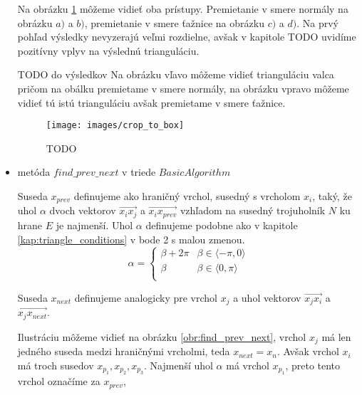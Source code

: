 \begin{itemize}
{        Na obrázku \ref{obr:crop_to_box} môžeme vidieť oba prístupy. Premietanie v smere normály 
        na obrázku $a)$ a $b)$, premietanie v smere ťažnice na obrázku $c)$ a $d)$. Na prvý pohľad 
        výsledky nevyzerajú veľmi rozdielne, avšak v kapitole TODO uvidíme pozitívny vplyv na výslednú 
        trianguláciu. 
        
        TODO do výsledkov
        Na obrázku vľavo môžeme vidieť trianguláciu valca pričom na obálku 
        premietame v smere normály, na obrázku vpravo môžeme vidieť tú istú trianguláciu 
        avšak premietame v smere ťažnice.

        \begin{figure}
            \centerline{\texttt{[image: images/crop\_to\_box]}}
            \caption[TODO]{TODO}
            \label{obr:crop_to_box}
        \end{figure}
    }
    \item{
        metóda $find\_prev\_next$ v triede $BasicAlgorithm$

        Suseda $x_{prev}$ definujeme ako 
                hraničný vrchol, susedný s vrcholom $x_i$, taký, že uhol $\alpha$ dvoch vektorov
                $\overrightarrow{x_i x_j}$ a $\overrightarrow{x_i x_{prev}}$ vzhľadom 
                na susedný trojuholník $N$ ku hrane $E$ je najmenší. Uhol $\alpha$ definujeme podobne
                ako v kapitole \ref{kap:triangle_conditions} v bode 2 s malou zmenou. 
                \[ 
                \alpha = \left\{
                \begin{array}{ll}
                    \beta + 2 \pi & \beta \in \langle -\pi, 0 \rangle\\
                    \beta & \beta \in \langle 0, \pi \rangle\\
                \end{array} 
                \right. 
                \]
                
                Suseda $x_{next}$ definujeme analogicky pre vrchol $x_j$ a uhol vektorov 
                $\overrightarrow{x_j x_i}$ a $\overrightarrow{x_j x_{next}}$.

                Ilustráciu môžeme vidieť na obrázku \ref{obr:find_prev_next}, vrchol $x_j$
                má len jedného suseda medzi hraničnými vrcholmi, teda $x_{next} = x_n$. 
                Avšak vrchol $x_i$ má troch
                susedov $x_{p_1}, x_{p_2}, x_{p_3}$. Najmenší uhol $\alpha$ má vrchol $x_{p_1}$,
                preto tento vrchol označíme za $x_{prev}$,

}
\end{itemize}
